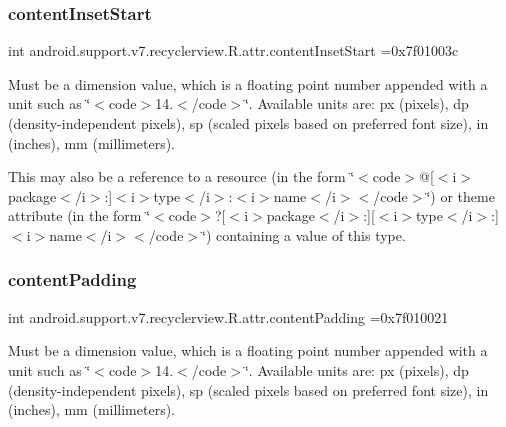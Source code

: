 \subsubsection{\texorpdfstring{content\+Inset\+Start}{contentInsetStart}}
{\footnotesize\ttfamily int android.\+support.\+v7.\+recyclerview.\+R.\+attr.\+content\+Inset\+Start =0x7f01003c\hspace{0.3cm}{\ttfamily [static]}}

Must be a dimension value, which is a floating point number appended with a unit such as \char`\"{}$<$code$>$14.\+5sp$<$/code$>$\char`\"{}. Available units are\+: px (pixels), dp (density-\/independent pixels), sp (scaled pixels based on preferred font size), in (inches), mm (millimeters). 

This may also be a reference to a resource (in the form \char`\"{}$<$code$>$@\mbox{[}$<$i$>$package$<$/i$>$\+:\mbox{]}$<$i$>$type$<$/i$>$\+:$<$i$>$name$<$/i$>$$<$/code$>$\char`\"{}) or theme attribute (in the form \char`\"{}$<$code$>$?\mbox{[}$<$i$>$package$<$/i$>$\+:\mbox{]}\mbox{[}$<$i$>$type$<$/i$>$\+:\mbox{]}$<$i$>$name$<$/i$>$$<$/code$>$\char`\"{}) containing a value of this type. \mbox{\label{classandroid_1_1support_1_1v7_1_1recyclerview_1_1R_1_1attr_a39a2e38477ef0d9f1e02fb872fe85cfa}} 
\subsubsection{\texorpdfstring{content\+Padding}{contentPadding}}
{\footnotesize\ttfamily int android.\+support.\+v7.\+recyclerview.\+R.\+attr.\+content\+Padding =0x7f010021\hspace{0.3cm}{\ttfamily [static]}}

Must be a dimension value, which is a floating point number appended with a unit such as \char`\"{}$<$code$>$14.\+5sp$<$/code$>$\char`\"{}. Available units are\+: px (pixels), dp (density-\/independent pixels), sp (scaled pixels based on preferred font size), in (inches), mm (millimeters). 

